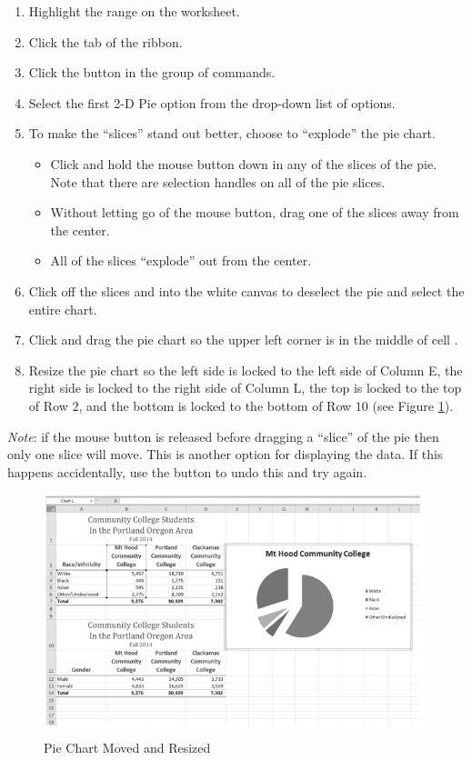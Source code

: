 \begin{enumerate}
	\item Highlight the range  on the  worksheet.
	\item Click the  tab of the ribbon.
	\item Click the  button in the  group of commands.
	\item Select the first 2-D Pie option from the drop-down list of options.
	\item To make the ``slices'' stand out better, choose to ``explode'' the pie chart.

	\begin{itemize}
		\item Click and hold the mouse button down in any of the slices of the pie. Note that there are selection handles on all of the pie slices.
		\item Without letting go of the mouse button, drag one of the slices away from the center.
		\item All of the slices ``explode'' out from the center.
	\end{itemize}

	\item Click off the slices and into the white canvas to deselect the pie and select the entire chart.
	\item Click and drag the pie chart so the upper left corner is in the middle of cell .
	\item Resize the pie chart so the left side is locked to the left side of Column E, the right side is locked to the right side of Column L, the top is locked to the top of Row $ 2 $, and the bottom is locked to the bottom of Row $ 10 $ (see Figure \ref{04:fig20}).
\end{enumerate}

\textit{Note}: if the mouse button is released before dragging a ``slice'' of the pie then only one slice will move. This is another option for displaying the data. If this happens accidentally, use the  button to undo this and try again.

\begin{figure}[H]
	\centering
	\includegraphics[width=\maxwidth{.95\linewidth}]{gfx/ch04_fig20}
	\caption{Pie Chart Moved and Resized}
	\label{04:fig20}
\end{figure}

